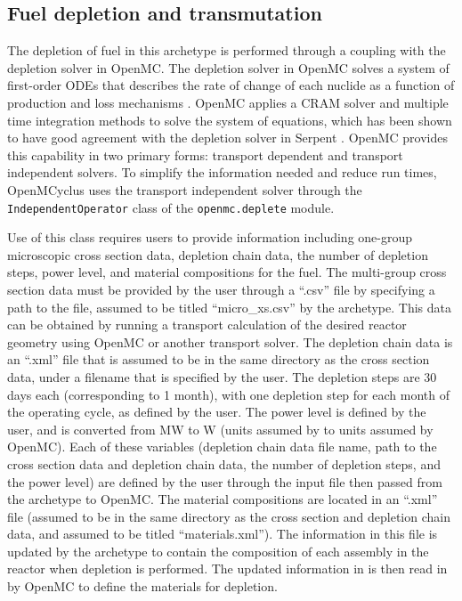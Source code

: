 \subsection{Fuel depletion and transmutation}
The depletion of fuel in this archetype is performed through a coupling with 
the depletion solver in OpenMC. The depletion solver in OpenMC solves a system 
of first-order ODEs that describes 
the rate of change of each nuclide as a function of production and loss 
mechanisms \cite{romano_depletion_2021}. OpenMC applies a \gls{CRAM} solver 
and multiple time integration methods to solve the system of equations, which 
has been shown to have good agreement with the depletion solver in Serpent 
\cite{romano_depletion_2021}. OpenMC provides this capability in two primary 
forms: transport dependent and transport independent solvers. To simplify 
the information needed and reduce run times, OpenMCyclus uses the transport 
independent solver through the \texttt{IndependentOperator} class of the 
\texttt{openmc.deplete} module. 

Use of this class requires users to provide information including 
one-group microscopic cross section data, depletion chain data, the 
number of depletion steps, 
power level, and material compositions for the fuel. The multi-group 
cross section data must be provided by the user through a ``.csv'' file by 
specifying a path to the file, assumed to be titled ``micro\_xs.csv'' by the 
archetype. This data can be obtained by running a transport calculation 
of the desired reactor geometry using OpenMC or another transport solver. 
The depletion chain data is an ``.xml'' file that is assumed to be in the 
same directory as the cross section data, under a filename that is specified 
by the user.
The depletion steps are 30 days each (corresponding to 1 month), 
with one depletion step for each month of the operating cycle, as defined by 
the user. The power level is defined by the user, and is converted from 
MW to W (units assumed by \Cyclus to units assumed by OpenMC). Each of these 
variables (depletion chain data file name, path to the cross section data and 
depletion chain data, the number of depletion steps, and the power level) are 
defined by the user through the \Cyclus input file then passed from the archetype 
to OpenMC. The material compositions are located in an ``.xml'' file 
(assumed to be in the same directory as the cross section and depletion 
chain data, and assumed to be titled ``materials.xml''). The information 
in this file is updated by the archetype to 
contain the composition of each assembly in the reactor when depletion is 
performed. The updated information in is then read in
by OpenMC to define the materials for depletion. 

